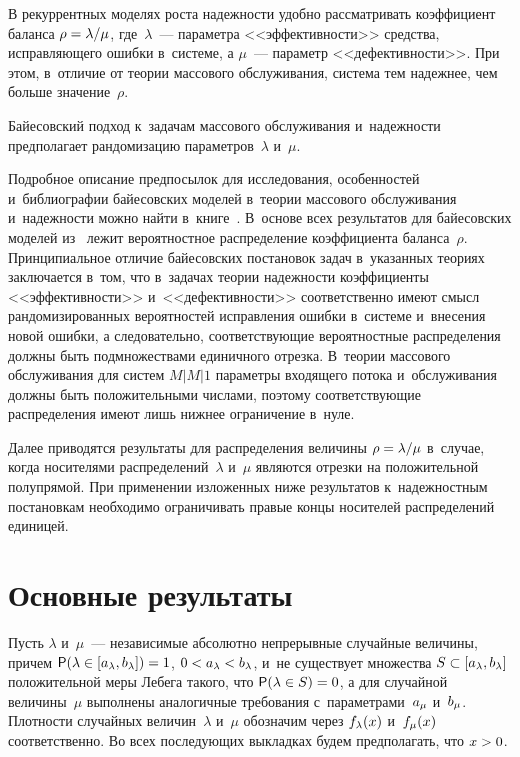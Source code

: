 \begin{multicols}{2}
В рекуррентных моделях роста надежности удобно рассматривать коэффициент 
баланса $\rho\hm=\lambda/\mu$, где~$\lambda$~--- параметра <<эффективности>> 
средства, исправляющего ошибки в~системе, а $\mu$~--- параметр 
<<дефективности>>. При этом, в~отличие от теории массового обслуживания, 
система тем надежнее, чем больше значение~$\rho$.

Байесовский подход к~задачам массового обслуживания и~надежности предполагает 
рандомизацию параметров~$\lambda$ и~$\mu$. 

Подробное описание предпосылок для 
исследования, особенностей и~биб\-ли\-о\-графии байесовских моделей в~теории массового 
обслуживания и~надежности можно найти в~книге~\cite{KuSh2015}. 
В~основе всех результатов для байесовских моделей из~\cite{KuSh2015} лежит 
вероятностное распределение коэффициента баланса~$\rho$. Принципиальное отличие 
байесовских постановок задач в~указанных теориях заключается в~том, что 
в~задачах теории надежности коэффициенты <<эффективности>> и~<<дефективности>> 
соответственно имеют смысл рандомизированных вероятностей исправления ошибки 
в~системе и~внесения новой ошибки, а следовательно, соответствующие вероятностные 
распределения должны быть подмножествами единичного отрезка. 
В~теории массового обслуживания для систем $M|M|1$ параметры входящего потока 
и~обслуживания должны быть положительными числами, поэтому соответствующие 
распределения имеют лишь нижнее ограничение в~нуле.

Далее приводятся результаты для распределения величины $\rho\hm=\lambda/\mu$ 
в~случае, когда носителями распределений~$\lambda$ и~$\mu$ являются отрезки 
на положительной полупрямой. При применении изложенных ниже результатов 
к~надежностным постановкам необходимо ограничивать правые концы носителей 
распределений единицей.

\vspace*{-9pt}

\section{Основные результаты}

Пусть $\lambda$ и~$\mu$~--- независимые абсолютно непрерывные случайные величины, 
причем  ${\sf P}(\lambda\hm\in[\al,\bll])\hm=1$, $0\hm<\al\hm<\bll$, 
и~не существует множества $S\hm\subset[\al,\bll]$ положительной меры Лебега такого, что 
${\sf P}(\lambda\hm\in S)\hm=0$, а для случайной величины~$\mu$ выполнены аналогичные 
требования с~параметрами~$a_\mu$ и~$b_\mu$. Плотности случайных величин~$\lambda$ 
и~$\mu$ обозначим через $f_\lambda(x)$ и~$f_\mu(x)$ соответственно. Во 
всех последующих выкладках будем предполагать, что $x\hm>0$.


\end{multicols}
